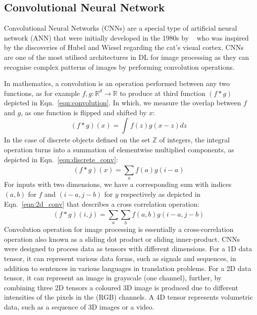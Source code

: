 \subsection{Convolutional Neural Network} 
Convolutional Neural Networks (CNNs) are a special type of artificial neural network (ANN) that were initially developed in the 1980s by ~\textcite{Fukushima1980} who was inspired by the discoveries of Hubel and Wiesel regarding the cat's visual cortex. 
CNNs are one of the most utilised architectures in DL for image processing as they can recognise complex patterns of images by performing convolution operations.

In mathematics, a convolution is an operation performed between any two functions, as for example \(f, g:\mathbb{R}^{d} \to \mathbb{R}\) to produce at third function \((f\ast g)\) depicted in Eqn.~\ref{eqn:convolution}.
In which, we measure the overlap between \(f\) and \(g\), as one function is flipped and shifted by \(x\):
\begin{equation}
	(f\ast g)(x) = \int_{}^{} f(z)g(x-z)dz
	\label{eqn:convolution}
\end{equation}
In the case of discrete objects defined on the set \(\mathbb{Z}\) of integers, the integral operation turns into a summation of elementwise multiplied components, as depicted in Eqn.~\ref{eqn:discrete_conv}:
\begin{equation}		
	(f\ast g)(x) = \sum_{a}^{} f(a)g(i-a)
	\label{eqn:discrete_conv}
\end{equation}
For inputs with two dimensions, we have a corresponding sum with indices \((a,b)\) for \(f\) and \((i-a, j-b)\) for \(y\) respectively as depicted in Eqn.~\ref{eqn:2d_conv} that describes a cross correlation operation:
\begin{equation}
	(f\ast g)(i,j) = \sum_{a}^{}\sum_{b}^{}f(a,b)g(i-a,j-b)
	\label{eqn:2d_conv}
\end{equation}
Convolution operation for image processing is essentially a cross-correlation operation also known as a sliding dot product or sliding inner-product. 
CNNs were designed to process data as tensors with different dimensions. 
For a 1D data tensor, it can represent various data forms, such as signals and sequences, in addition to sentences in various languages in translation problems.
For a 2D data tensor, it can represent an image in grayscale (one channel), further, by combining three 2D tensors a coloured 3D image is produced due to different intensities of the pixels in the (RGB) channels.
A 4D tensor represents volumetric data, such as a sequence of 3D images or a video.

